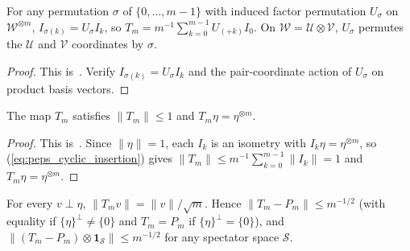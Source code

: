 \begin{lemma}
    \label{thm:peps_insertion_permutation}
    \leanok
    For any permutation $\sigma$ of $\{0,\dots,m-1\}$ with induced factor
    permutation $U_\sigma$ on $\mathcal W^{\otimes m}$, $I_{\sigma(k)}=U_\sigma I_k$,
    so $T_m=m^{-1}\sum_{k=0}^{m-1}U_{(+k)}I_0$. On
    $\mathcal W=\mathcal U\otimes\mathcal V$, $U_\sigma$ permutes the
    $\mathcal U$ and $\mathcal V$ coordinates by $\sigma$.
\end{lemma}

\begin{proof}\leanok
    This is~\cite[``Insertions as permutations of the
        factors'']{QICLean2026Blueprint}.
    Verify $I_{\sigma(k)}=U_\sigma I_k$ and the pair-coordinate action of
    $U_\sigma$ on product basis vectors.
\end{proof}

\begin{lemma}
    \label{thm:peps_cyclic_insertion_basic}
    \leanok
    The map $T_m$ satisfies $\|T_m\|\le 1$ and $T_m\eta=\eta^{\otimes m}$.
\end{lemma}

\begin{proof}\leanok
    This is~\cite[``Contractivity and the fixed vector'']{QICLean2026Blueprint}.
    Since $\|\eta\|=1$, each $I_k$ is an isometry with $I_k\eta=\eta^{\otimes m}$,
    so (\ref{eq:peps_cyclic_insertion}) gives $\|T_m\|\le m^{-1}\sum_{k=0}^{m-1}\|I_k\|=1$
    and $T_m\eta=\eta^{\otimes m}$.
\end{proof}

\begin{lemma}
    \label{thm:peps_one_effect_estimate}
    \leanok
    For every $v\perp\eta$, $\|T_mv\|=\|v\|/\sqrt m$. Hence
    $\|T_m-P_m\|\le m^{-1/2}$ (with equality if $\{\eta\}^\perp\neq\{0\}$ and
    $T_m=P_m$ if $\{\eta\}^\perp=\{0\}$), and
    $\|(T_m-P_m)\otimes\mathbf 1_{\mathcal S}\|\le m^{-1/2}$ for any spectator
    space $\mathcal S$.
\end{lemma}

